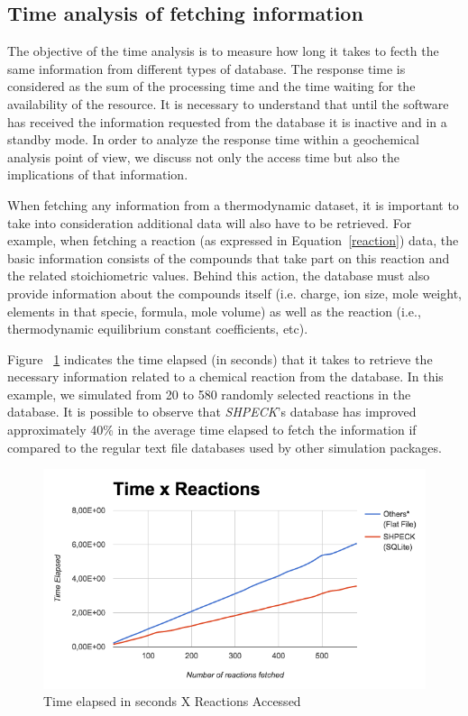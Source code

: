 \subsection{Time analysis of fetching information}
The objective of the time analysis is to measure how long it takes to fecth the same information from different types of database. The response time is considered as the sum of the processing time and the time waiting for the availability of the resource. It is necessary to understand that until the software has received the information requested from the database it is inactive and in a standby mode. In order to analyze the response time within a geochemical analysis point of view, we discuss not only the access time but also the implications of that information. 


When fetching any information from a thermodynamic dataset, it is important to take into consideration additional data will also have to be retrieved. For example, when fetching a reaction (as expressed in Equation~\ref{reaction}) data, the basic information consists of the compounds that take part on this reaction and the related stoichiometric values. Behind this action, the database must also provide information about the compounds itself (i.e. charge, ion size, mole weight, elements in that specie, formula, mole volume) as well as the reaction (i.e., thermodynamic equilibrium constant coefficients, etc).

Figure ~\ref{fig:timeXaccess} indicates the time elapsed (in seconds) that it takes to retrieve the necessary information related to a chemical reaction from the database. In this example, we simulated from 20 to 580 randomly selected reactions in the database. It is possible to observe that \emph{SHPECK}'s database has improved approximately 40\% in the average time elapsed to fetch the information if compared to the regular text file databases used by other simulation packages.

\begin{figure}[ht!]
\centering
\includegraphics[width=140mm]{figures/timeXreactionAccess.png}
\caption{Time elapsed in seconds X Reactions Accessed}
\label{fig:timeXaccess}
\end{figure}

